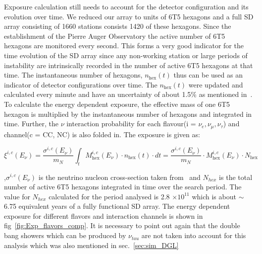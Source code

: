 Exposure calculation still needs to account for the detector configuration and its evolution over time. We reduced our array to units of 6T5 hexagons and a full SD array consisting of 1660 stations consists 1420 of these hexagons. Since the establishment of the Pierre Auger Observatory the active number of 6T5 hexagons are monitored every second. This forms a very good indicator for the time evolution of the SD array since any non-working station or large periods of instability are intrinsically recorded in the number of active 6T5 hexagons at that time. The instantaneous number of hexagons, $n_{\text{hex}}(t)$ thus can be used as an indicator of detector configurations over time. The $n_{\text{hex}}(t)$ were updated and calculated every minute and have an uncertainty of about 1.5\% as mentioned in~\cite{PierreAuger:2010zof}. To calculate the energy dependent exposure, the effective mass of one 6T5 hexagon is multiplied by the instantaneous number of hexagons and integrated in time. Further, the $\nu$ interaction probability for each flavour(i = $\nu_e, \nu_{\mu}, \nu_{\tau}$) and channel(c = CC, NC) is also folded in. The exposure is given as:

\begin{equation}
  \xi^{i,c}(E_{\nu}) = \frac{\sigma^{i,c}(E_{\nu})}{m_N} \int_{t} M_{\text{hex}}^{i,c}(E_{\nu}) \cdot n_{\text{hex}}(t) \cdot dt =  \frac{\sigma^{i,c}(E_{\nu})}{m_N} \cdot M_{\text{hex}}^{i,c}(E_{\nu}) \cdot N_{\text{hex}}
\end{equation}

,$\sigma^{i,c}(E_{\nu})$ is the neutrino nucleon cross-section taken from~\cite{Cooper-Sarkar:2011jtt} and $N_{hex}$ is the total number of active 6T5 hexagons integrated in time over the search period. The value for $N_{hex}$ calculated for the period analysed is 2.8 $\times 10^{11}$ which is about $\sim$6.75 equivalent years of a fully functional SD array. The energy dependent exposure for different flavors and interaction channels is shown in fig~\ref{fig:Exp_flavors_comp}. It is necessary to point out again that the double bang showers which can be produced by $\nu_{tau}$ are not taken into account for this analysis which was also mentioned in sec.~\ref{sec:sim_DGL} 

